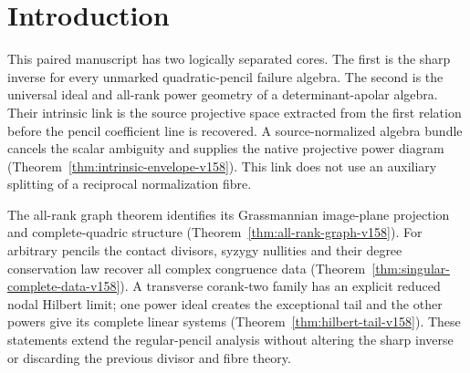 \begin{abstract}
An unmarked, ungraded finite multiplication-failure algebra recovers
every complex quadratic pencil at the sharp order $n^2+2n-4$, including
singular pencils. The inverse reconstructs the tensor rulings and
orients them by unequal coefficient-support ranks. Before recovering
the pencil coefficient line, its first relation already determines
the native source projective space. We construct on that space a
source-normalized determinant-apolar algebra bundle and its projective
power diagram, functorially under arbitrary ungraded algebra
isomorphisms. Scalar twists cancel in the algebra bundle, so no
splitting of an auxiliary normalization fibre is used. The relative
inverse and the detailed geometric and local forms are included.
The companion identifies all-rank power graphs and singular-pencil
invariants, computes simultaneous ordinary-collision Hilbert fibres
with every tail power map, and gives positive-dimensional residual-pencil
moduli in an incidence fibre. This master preserves the complete
mathematical contents of the two focused papers; it is not a third
submission. On the simple corank-two open in
every dimension, the entire normalized Hilbert incidence modification
is a smooth codimension-two blow-up, with centre and normal directions
recovered from failure multiplication.
\end{abstract}
\maketitle
\section{Introduction}
\label{sec:introduction-v153}
This paired manuscript has two logically separated cores. The first
is the sharp inverse for every unmarked quadratic-pencil failure
algebra. The second is the universal ideal and all-rank power geometry
of a determinant-apolar algebra. Their intrinsic link is the source
projective space extracted from the first relation before the pencil
coefficient line is recovered. A source-normalized algebra bundle
cancels the scalar ambiguity and supplies the native projective power
diagram (Theorem~\ref{thm:intrinsic-envelope-v158}). This link does not
use an auxiliary splitting of a reciprocal normalization fibre.

The all-rank graph theorem identifies its Grassmannian image-plane
projection and complete-quadric structure
(Theorem~\ref{thm:all-rank-graph-v158}). For arbitrary pencils the
contact divisors, syzygy nullities and their degree conservation law
recover all complex congruence data
(Theorem~\ref{thm:singular-complete-data-v158}). A transverse
corank-two family has an explicit reduced nodal Hilbert limit; one
power ideal creates the exceptional tail and the other powers give
its complete linear systems (Theorem~\ref{thm:hilbert-tail-v158}).
These statements extend the regular-pencil analysis without altering
the sharp inverse or discarding the previous divisor and fibre theory.

